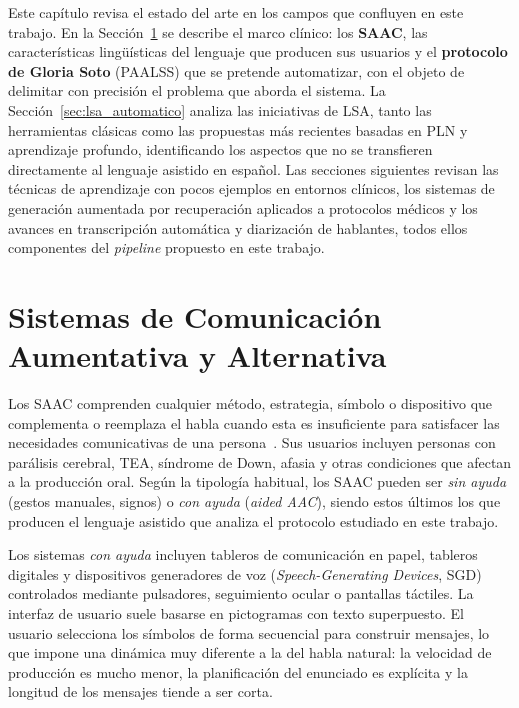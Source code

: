Este capítulo revisa el estado del arte en los campos que confluyen en este trabajo.
En la Sección~\ref{sec:saac} se describe el marco clínico: los \textbf{\ac{SAAC}}, las
características lingüísticas del lenguaje que producen sus usuarios y el
\textbf{protocolo de Gloria Soto} (\ac{PAALSS}) que se pretende automatizar, con el objeto
de delimitar con precisión el problema que aborda el sistema. La Sección~\ref{sec:lsa_automatico}
analiza las iniciativas de \ac{LSA}, tanto las herramientas clásicas como las propuestas más
recientes basadas en \ac{PLN} y aprendizaje profundo, identificando los aspectos que no se
transfieren directamente al lenguaje asistido en español. Las secciones siguientes revisan
las técnicas de aprendizaje con pocos ejemplos en entornos clínicos, los sistemas de
generación aumentada por recuperación aplicados a protocolos médicos y los avances en
transcripción automática y diarización de hablantes, todos ellos componentes del
\emph{pipeline} propuesto en este trabajo.


\newpage
\section{Sistemas de Comunicación Aumentativa y Alternativa}
\label{sec:saac}

Los \ac{SAAC} comprenden cualquier método, estrategia, símbolo o dispositivo que
complementa o reemplaza el habla cuando esta es insuficiente para satisfacer las
necesidades comunicativas de una persona~\cite{nlp_aac_application}.  Sus usuarios
incluyen personas con parálisis cerebral, \ac{TEA}, síndrome de Down, afasia y otras
condiciones que afectan a la producción oral.  Según la tipología habitual, los \ac{SAAC}
pueden ser \emph{sin ayuda} (gestos manuales, signos) o \emph{con ayuda}
(\emph{aided AAC}), siendo estos últimos los que producen el lenguaje asistido que
analiza el protocolo estudiado en este trabajo.

Los sistemas \emph{con ayuda} incluyen tableros de comunicación en papel, tableros
digitales y dispositivos generadores de voz (\emph{Speech-Generating Devices}, \ac{SGD})
controlados mediante pulsadores, seguimiento ocular o pantallas táctiles.  La interfaz de
usuario suele basarse en pictogramas con texto superpuesto. El usuario selecciona los 
símbolos de forma secuencial para construir mensajes, lo que impone una dinámica muy 
diferente a la del habla natural: la velocidad de producción es mucho menor, 
la planificación del enunciado es explícita y la longitud de los mensajes tiende a 
ser corta.



